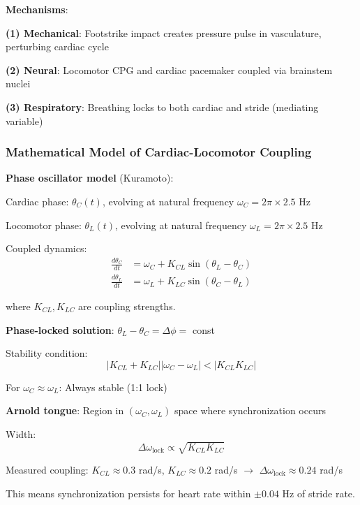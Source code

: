\documentclass[11pt,onecolumn]{article}
\begin{document}
\textbf{Mechanisms}:

\textbf{(1) Mechanical}: Footstrike impact creates pressure pulse in vasculature, perturbing cardiac cycle

\textbf{(2) Neural}: Locomotor CPG and cardiac pacemaker coupled via brainstem nuclei

\textbf{(3) Respiratory}: Breathing locks to both cardiac and stride (mediating variable)

\subsubsection{Mathematical Model of Cardiac-Locomotor Coupling}

\textbf{Phase oscillator model} (Kuramoto):

Cardiac phase: $\theta_C(t)$, evolving at natural frequency $\omega_C = 2\pi \times 2.5$ Hz

Locomotor phase: $\theta_L(t)$, evolving at natural frequency $\omega_L = 2\pi \times 2.5$ Hz

Coupled dynamics:
\begin{align}
\frac{d\theta_C}{dt} &= \omega_C + K_{CL}\sin(\theta_L - \theta_C) \\
\frac{d\theta_L}{dt} &= \omega_L + K_{LC}\sin(\theta_C - \theta_L)
\end{align}

where $K_{CL}, K_{LC}$ are coupling strengths.

\textbf{Phase-locked solution}: $\theta_L - \theta_C = \Delta\phi = $ const

Stability condition:
\begin{equation}
|K_{CL} + K_{LC}||\omega_C - \omega_L| < |K_{CL}K_{LC}|
\end{equation}

For $\omega_C \approx \omega_L$: Always stable (1:1 lock)

\textbf{Arnold tongue}: Region in $(\omega_C, \omega_L)$ space where synchronization occurs

Width:
\begin{equation}
\Delta\omega_{\text{lock}} \propto \sqrt{K_{CL}K_{LC}}
\end{equation}

Measured coupling: $K_{CL} \approx 0.3$ rad/s, $K_{LC} \approx 0.2$ rad/s $\to$ $\Delta\omega_{\text{lock}} \approx 0.24$ rad/s

This means synchronization persists for heart rate within $\pm 0.04$ Hz of stride rate.
\end{document}
